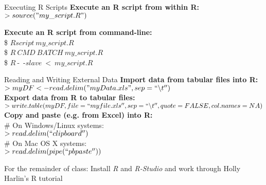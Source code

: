 \documentclass{beamer}
\begin{document}
\begin{frame}{Executing R Scripts}
\textbf{Execute an R script from within R:}\\

$> source("my\_script.R")$\\
\vspace{0.50cm}

\textbf{Execute an R script from command-line:}\\

\$ $Rscript~my\_script.R$\\
\$ $R~CMD~BATCH~my\_script.R$\\
\$ $R~$-~-$slave~<~my\_script.R$
\end{frame}

\begin{frame}{Reading and Writing External Data}
\textbf{Import data from tabular files into R:}\\
$> myDF <- read.delim("myData.xls", sep=``\backslash{t}'')$\\
\textbf{Export data from R to tabular files:}\\
$> write.table(myDF, file=``myfile.xls'', sep=``\backslash{t}'', quote=FALSE, col.names=NA)$\\
\vspace{0.25cm}
\textbf{Copy and paste (e.g. from Excel) into R:}\\
\# On Windows/Linux systems:\\
$> read.delim(``clipboard'')$\\
\# On Mac OS X systems:\\
$> read.delim(pipe(``pbpaste''))$
\end{frame}

\begin{frame}
\begin{center}
\Large{For the remainder of class: Install \emph{R} and \emph{R-Studio} and work through
Holly Harlin's R tutorial}
 \end{center}
\end{frame}
\end{document}
